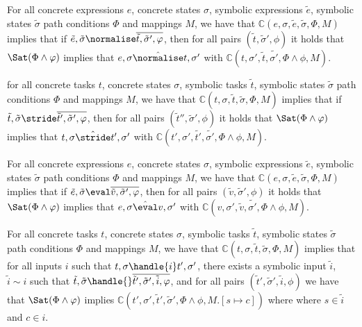 \begin{lemma}
  \label{lem:soundnorm}
  For all concrete expressions $e$, concrete states $\sigma$, symbolic expressions $\tilde{e}$, symbolic states $\tilde{\sigma}$ path conditions $\Phi$ and mappings $M$,
  we have that $\mathds{C}(e,\sigma,\tilde{e},\tilde{\sigma},\Phi,M)$ implies
  that if $\tilde{e},\tilde{\sigma}\normalise\overline{\tilde{t},\tilde{\sigma}',\phi}$,
  then for all pairs $(\tilde{t},\tilde{\sigma}',\phi)$ it holds that $\Sat(\Phi\land\phi)$ implies
  that $e,\sigma\hat{\normalise}t,\sigma'$ with $\mathds{C}(t,\sigma',\tilde{t},\tilde{\sigma'},\Phi\land\phi,M)$.
\end{lemma}

\begin{lemma}
  for all concrete tasks $t$, concrete states $\sigma$, symbolic tasks $\tilde{t}$, symbolic states $\tilde{\sigma}$ path conditions $\Phi$ and mappings $M$,
  we have that $\mathds{C}(t,\sigma,\tilde{t},\tilde{\sigma},\Phi,M)$ implies
  that if $\tilde{t},\tilde{\sigma}\stride\overline{\tilde{t}',\tilde{\sigma}',\phi}$,
  then for all pairs $(\tilde{t}'',\tilde{\sigma}',\phi)$ it holds that $\Sat(\Phi\land\phi)$ implies
  that $t,\sigma\hat{\stride}t',\sigma'$ with $\mathds{C}(t',\sigma',\tilde{t'},\tilde{\sigma'},\Phi\land\phi,M)$.
\end{lemma}

\begin{lemma}
  For all concrete expressions $e$, concrete states $\sigma$, symbolic expressions $\tilde{e}$, symbolic states $\tilde{\sigma}$ path conditions $\Phi$ and mappings $M$,
  we have that $\mathds{C}(e,\sigma,\tilde{e},\tilde{\sigma},\Phi,M)$ implies
  that if $\tilde{e},\tilde{\sigma}\eval\overline{\tilde{v},\tilde{\sigma}',\phi}$,
  then for all pairs $(\tilde{v},\tilde{\sigma}',\phi)$ it holds that $\Sat(\Phi\land\phi)$ implies
  that $e,\sigma\hat{\eval}v,\sigma'$ with $\mathds{C}(v,\sigma',\tilde{v},\tilde{\sigma'},\Phi\land\phi,M)$.
\end{lemma}




\begin{lemma}
  \label{lem:completeHandle}
  For all concrete tasks $t$, concrete states $\sigma$, symbolic tasks $\tilde{t}$, symbolic states $\tilde{\sigma}$ path conditions $\Phi$ and mappings $M$,
  we have that $\mathds{C}(t,\sigma,\tilde{t},\tilde{\sigma},\Phi,M)$ implies
  that for all inputs $i$ such that $t,\sigma\handle{i}t',\sigma'$,
  there exists a symbolic input $\tilde{i}$, $\tilde{i}\sim i$ such that
  $\tilde{t},\tilde{\sigma}\handle{}\overline{\tilde{t}',\tilde{\sigma}',\tilde{i},\phi}$,
  and for all pairs $(\tilde{t}',\tilde{\sigma}',\tilde{i},\phi)$ we have that $\Sat(\Phi\land\phi)$ implies $\mathds{C}(t',\sigma',\tilde{t}',\tilde{\sigma}',\Phi\land\phi,M.[s\mapsto c])$ where where $s\in\tilde{i}$ and $c\in i$.
\end{lemma}

